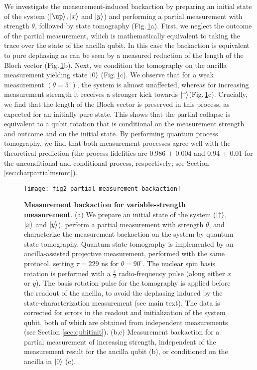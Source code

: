 We investigate the measurement-induced backaction by preparing an initial state of the system ($\ket{\up},\ket{x}$ and $\left|y\right>$) and performing a partial measurement with strength $\theta$, followed by state tomography (Fig.\,\ref{fig:amc-fig2}a). First, we neglect the outcome of the partial measurement, which is mathematically equivalent to taking the trace over the state of the ancilla qubit. In this case the backaction is equivalent to pure dephasing as can be seen by a measured reduction of the length of the Bloch vector (Fig.\,\ref{fig:amc-fig2}b). Next, we condition the tomography on the ancilla measurement yielding state $\left|0\right>$ (Fig.\,\ref{fig:amc-fig2}c). We observe that for a weak measurement $(\theta = 5^{\circ})$, the system is almost unaffected, whereas for increasing measurement strength it receives a stronger kick towards $\left|\uparrow\right> $(Fig.\,\ref{fig:amc-fig2}c). Crucially, we find that the length of the Bloch vector is preserved in this process, as expected for an initially pure state. This shows that the partial collapse is equivalent to a qubit rotation that is conditional on the measurement strength and outcome and on the initial state. By performing quantum process tomography, we find that both measurement processes agree well with the theoretical prediction (the process fidelities are 0.986 $\pm$ 0.004 and 0.94 $\pm$ 0.01 for the unconditional and conditional process, respectively; see Section \ref{sec:charpartialmsmnt}).


\begin{figure}
	\centering
	\texttt{[image: fig2\_partial\_measurement\_backaction]}
	\caption{\label{fig:amc-fig2} \textbf{Measurement backaction for variable-strength measurement}. (a) We prepare an initial state  of the system ($\left|\uparrow\right>$,  $\left|x\right>$ and  $\left|y\right>$), perform a partial measurement with strength $\theta$, and characterize the measurement backaction on the system by quantum state tomography. Quantum state tomography is implemented by an ancilla-assisted projective measurement, performed with the same protocol, setting $\tau = 229$ ns for $\theta = 90^{\circ}$. The nuclear spin basis rotation is performed with a $\frac{\pi}{2}$ radio-frequency pulse (along either $x$ or $y$). The basis rotation pulse for the tomography is applied before the readout of the ancilla, to avoid the dephasing induced by the state-characterization measurement (see main text). The data is corrected for errors in the readout and initialization of the system qubit, both of which are obtained from independent measurements (see Section \ref{sec:qubitinit}). (b,c)  Measurement backaction for a partial measurement of increasing strength, independent of the measurement result for the ancilla qubit (b), or conditioned on the ancilla in  $\left|0\right>$ (c). }
\end{figure}

